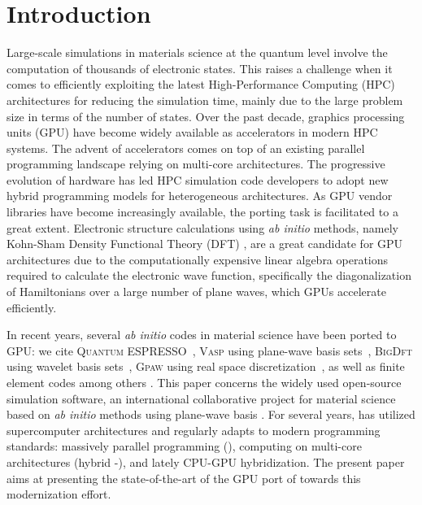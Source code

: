 \documentclass[twocolumn,superscriptaddress]{revtex4-1}
\begin{document}
\maketitle

\section{Introduction}

Large-scale simulations in materials science at the quantum level involve the computation of thousands of electronic states. This raises a challenge when it comes to efficiently exploiting the latest High-Performance Computing (HPC) architectures for reducing the simulation time, mainly due to the large problem size in terms of the number of states. Over the past decade, graphics processing units (GPU) have become widely available as accelerators in modern HPC systems. The advent of accelerators comes on top of an existing parallel programming landscape relying on multi-core architectures. The progressive evolution of hardware has led HPC simulation code developers to adopt new hybrid programming models for heterogeneous architectures. As GPU vendor libraries have become increasingly available, the porting task is facilitated to a great extent. Electronic structure calculations using \textit{ab initio} methods, namely Kohn-Sham Density Functional Theory (DFT) \cite{PhysRev.136.B864,PhysRev.140.A1133}, are a great candidate for GPU architectures due to the computationally expensive linear algebra operations required to calculate the electronic wave function, specifically the diagonalization of Hamiltonians over a large number of plane waves, which GPUs accelerate efficiently.

In recent years, several \textit{ab initio} codes in material science have been ported to GPU: we cite \textsc{Quantum ESPRESSO}~\cite{QE_GPU}, \textsc{Vasp} using plane-wave basis sets~\cite{https://doi.org/10.1002/jcc.23096,10.1007/978-3-319-78054-2_8,10.1007/s11227-024-06066-0}, \textsc{BigDft} using wavelet basis sets~\cite{genovese2011improvements}, \textsc{Gpaw} using real space discretization~\cite{10.1063/5.0182685}, as well as finite element codes \cite{DAS2022108473,10.1145/3295500.3357157} among others \cite{10.1063/5.0260892}. This paper concerns the widely used \abinit open-source simulation software, an international collaborative project for material science based on \textit{ab initio} methods using plane-wave basis \cite{Verstraete2025}. For several years, \abinit has utilized supercomputer architectures \cite{GAVINI2023} and regularly adapts to modern programming standards: massively parallel programming (\mpi), computing on multi-core architectures (hybrid \mpi-\openmp), and lately CPU-GPU hybridization. The present paper aims at presenting the state-of-the-art of the GPU port of \abinit towards this modernization effort.
\end{document}
